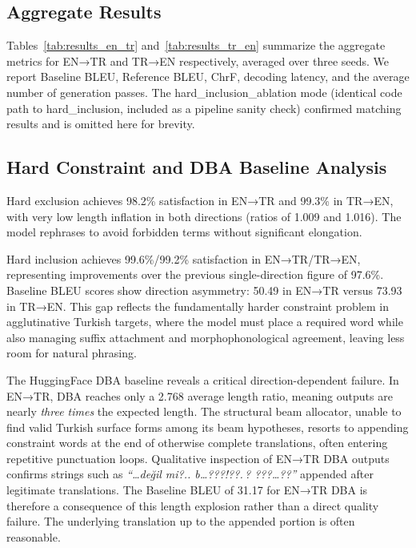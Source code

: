 \documentclass[conference]{IEEEtran}
\begin{document}
\subsection{Aggregate Results}

Tables~\ref{tab:results_en_tr} and~\ref{tab:results_tr_en} summarize the aggregate metrics for EN→TR and TR→EN respectively, averaged over three seeds. We report Baseline BLEU, Reference BLEU, ChrF, decoding latency, and the average number of generation passes. The hard\_inclusion\_ablation mode (identical code path to hard\_inclusion, included as a pipeline sanity check) confirmed matching results and is omitted here for brevity.

\subsection{Hard Constraint and DBA Baseline Analysis}

Hard exclusion achieves 98.2\% satisfaction in EN→TR and 99.3\% in TR→EN, with very low length inflation in both directions (ratios of 1.009 and 1.016). The model rephrases to avoid forbidden terms without significant elongation.

Hard inclusion achieves 99.6\%/99.2\% satisfaction in EN→TR/TR→EN, representing improvements over the previous single-direction figure of 97.6\%. Baseline BLEU scores show direction asymmetry: 50.49 in EN→TR versus 73.93 in TR→EN. This gap reflects the fundamentally harder constraint problem in agglutinative Turkish targets, where the model must place a required word while also managing suffix attachment and morphophonological agreement, leaving less room for natural phrasing.

The HuggingFace DBA baseline reveals a critical direction-dependent failure. In EN→TR, DBA reaches only a 2.768 average length ratio, meaning outputs are nearly \emph{three times} the expected length. The structural beam allocator, unable to find valid Turkish surface forms among its beam hypotheses, resorts to appending constraint words at the end of otherwise complete translations, often entering repetitive punctuation loops. Qualitative inspection of EN→TR DBA outputs confirms strings such as \emph{``\dots değil mi?.. b\dots???!??.\,? ???\dots??''} appended after legitimate translations. The Baseline BLEU of 31.17 for EN→TR DBA is therefore a consequence of this length explosion rather than a direct quality failure. The underlying translation up to the appended portion is often reasonable.
\end{document}
